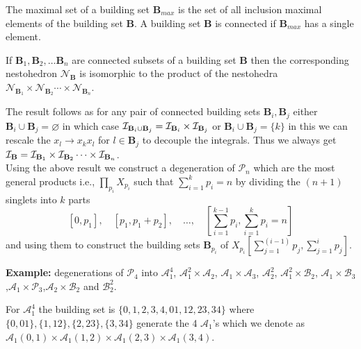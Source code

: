 \documentclass[hidelinks,12pt]{article}
\begin{document}
The maximal set of a building set ${\mathbf B_{max}}$ is the set of all inclusion maximal elements of the building set ${\mathbf B}$. A building set ${\mathbf B}$ is connected if ${\mathbf B_{max}}$ has a single element\cite{Postnikov:2006}.

\vspace{1ex}

 If ${\mathbf B_1},{\mathbf B_2},\dots {\mathbf B_n}$ are connected subsets of a building set ${\mathbf B}$ then the corresponding nestohedron ${\mathscr N_{{\mathbf B}}}$ is isomorphic to the product of the nestohedra ${\mathscr N}_{ {\mathbf B_1}} \times{\mathscr N}_{ {\mathbf B_2}} \cdots \times {\mathscr N}_{{\mathbf B_n}}$\cite{Postnikov:2006}.

\vspace{1ex}

The result follows as for any pair of connected building sets ${\mathbf B_{i}},{\mathbf B_{j}}$ either  ${\mathbf B_{i}} \cup {\mathbf B_{j}} = \varnothing $ in which case ${\cal I}_{{\mathbf B_i}\cup {\mathbf B_j}} = {\cal I}_{\mathbf B_i} \times {\cal I}_{\mathbf B_j}$ or ${\mathbf B_{i}} \cup {\mathbf B_{j}} = \{k\}$ in this we can rescale the $x_l \rightarrow x_k x_l$ for $l \in {\mathbf B_{j}} $ to decouple the integrals. Thus we always get ${\cal I}_{\mathbf B}={\cal I}_{\mathbf B_1}\times{\cal I}_{\mathbf B_2}\cdots \times{\cal I}_{\mathbf B_n}$. \\
Using the above result we construct a degeneration of  ${\mathscr P_n}$ which are the most general products i.e., $\prod_{p_i} X_{p_i}$ such that $\sum^{k}_{i=1} p_{i} = n$ by dividing the $(n+1)$ singlets into $k$ parts 
\[
[0,p_1],\quad [p_1,p_1+p_2],\quad \dots ,\quad [\sum^{k-1}_{i=1}p_{i},\sum^{k}_{i=1}p_{i}= n]
\]
and using them to construct the building sets $\mathbf B_{p_i}$ of $X_{p_i}\left[\sum^{(i-1)}_{j=1}p_{j},\sum^{i}_{j=1}p_{j}\right].$ 

{\bf Example:} degenerations of ${\mathscr P_4}$ into ${\mathscr A_1^{4}}$, ${\mathscr A_1^2} \times{\mathscr A_2}$, ${\mathscr A_1} \times {\mathscr A_3}$, ${\mathscr A^{2}_2}$, ${\mathscr A_1^2} \times {\mathscr B_2}$, ${\mathscr A_1} \times {\mathscr B_3}$,${\mathscr A_1} \times {\mathscr P_3}$,$ {\mathscr A_2}\times {\mathscr B_2}$ and ${\mathscr B^{2}_2}$.
 
For ${\mathscr A_1^{4}}$ the building set is $ \{ {0},{1},{2},{3},{4},{01},{12},{23},{34} \}$ where $\{0,01\} , \{1,12\},\{2,23\},\{3,34\}$ generate the 4 ${\mathscr A_1}$'s which we denote as ${\mathscr A_1}(0,1) \times {\mathscr A_1}(1,2) \times {\mathscr A_1}(2,3) \times {\mathscr A_1}(3,4) $.
\end{document}
